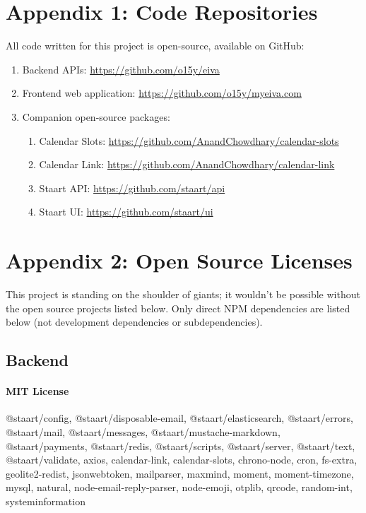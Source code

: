 \documentclass{article}
\begin{document}
\newpage

\cleardoublepage
{}
\setcounter{page}{\thesavepage}

\section*{Appendix 1: Code Repositories}

All code written for this project is open-source, available on GitHub:

\begin{enumerate}
	\item Backend APIs: \url{https://github.com/o15y/eiva}
	\item Frontend web application: \url{https://github.com/o15y/myeiva.com}
	\item Companion open-source packages:
	\begin{enumerate}
		\item Calendar Slots: \url{https://github.com/AnandChowdhary/calendar-slots}
		\item Calendar Link: \url{https://github.com/AnandChowdhary/calendar-link}
		\item Staart API: \url{https://github.com/staart/api}
		\item Staart UI: \url{https://github.com/staart/ui}
	\end{enumerate}
\end{enumerate}

\newpage

\section*{Appendix 2: Open Source Licenses}

This project is standing on the shoulder of giants; it wouldn't be possible without the open source projects listed below. Only direct NPM dependencies are listed below (not development dependencies or subdependencies).

\subsection*{Backend}

\paragraph{MIT License} @staart/config, @staart/disposable-email, @staart/elasticsearch, @staart/errors, @staart/mail, @staart/messages, @staart/mustache-markdown, @staart/payments, @staart/redis, @staart/scripts, @staart/server, @staart/text, @staart/validate, axios, calendar-link, calendar-slots, chrono-node, cron, fs-extra, geolite2-redist, jsonwebtoken, mailparser, maxmind, moment, moment-timezone, mysql, natural, node-email-reply-parser, node-emoji, otplib, qrcode, random-int, systeminformation
\end{document}
